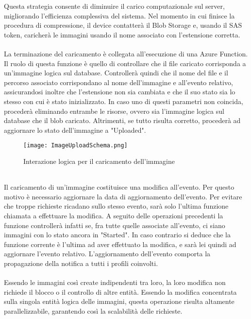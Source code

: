 Questa strategia consente di diminuire il carico computazionale sul server, 
migliorando l'efficienza complessiva del sistema.
Nel momento in cui finisce la procedura di compressione,
il device contatterà il Blob Storage e, usando il SAS token,
caricherà le immagini usando il nome associato con l'estensione corretta.\\
\\
La terminazione del caricamento è collegata all'esecuzione di una Azure Function.
Il ruolo di questa funzione è quello di controllare che il file caricato corrisponda
a un'immagine logica sul database.
Controllerà quindi che il nome del file e il percorso associato corrispondano 
al nome dell'immagine e all'evento relativo, 
assicurandosi inoltre che l'estensione non sia cambiata 
e che il suo stato sia lo stesso con cui è stato inizializzato.
In caso uno di questi parametri non coincida, 
procederà eliminando entrambe le risorse, 
ovvero sia l'immagine logica sul database che il blob caricato.
Altrimenti, se tutto risulta corretto,
procederà ad aggiornare lo stato dell'immagine a "Uploaded".\\
\begin{figure}[h!]
    \centering
    \texttt{[image: ImageUploadSchema.png]}
    \caption{Interazione logica per il caricamento dell'immagine}
\end{figure}
\\
Il caricamento di un'immagine costituisce una modifica all'evento.
Per questo motivo è necessario aggiornare la data di aggiornamento dell'evento.
Per evitare che troppe richieste ricadano sullo stesso evento,
sarà solo l'ultima funzione chiamata a effettuare la modifica.
A seguito delle operazioni precedenti la funzione controllerà infatti se, 
fra tutte quelle associate all'evento, ci siano immagini con lo stato ancora in "Started".
In caso contrario si deduce che la funzione corrente è l'ultima ad aver effettuato la modifica,
e sarà lei quindi ad aggiornare l'evento relativo.
L'aggiornamento dell'evento comporta la propagazione della notifica a tutti i profili coinvolti.\\
\\
Essendo le immagini così create indipendenti tra loro,
la loro modifica non richiede il blocco o il controllo di altre entità.
Essendo la modifica concentrata sulla singola entità logica delle immagini,
questa operazione risulta altamente parallelizzabile,
garantendo così la scalabilità delle richieste.\\
\\

